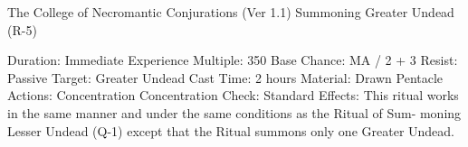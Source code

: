 \begin{Chapter}{The College of Necromantic Conjurations (Ver 1.1)}
Summoning Greater Undead (R-5) 

Duration: Immediate 
Experience Multiple: 350 
Base Chance: MA / 2 + 3%
Resist: Passive 
Target: Greater Undead 
Cast Time: 2 hours 
Material: Drawn Pentacle 
Actions: Concentration 
Concentration Check: Standard 
Effects:  This  ritual  works  in  the  same  manner  and 
under  the  same  conditions  as  the  Ritual  of  Sum-
moning Lesser Undead (Q-1) except that the Ritual 
summons only one Greater Undead. 

\end{Chapter}
